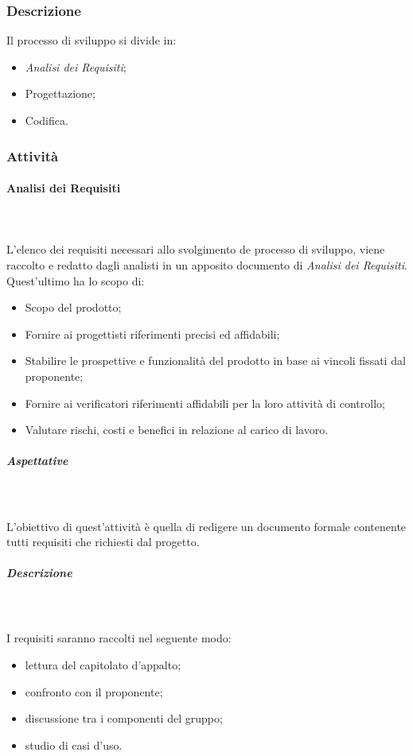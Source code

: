 		\subsubsection{Descrizione}
			Il processo di sviluppo si divide in:
				\begin{itemize}
					\item \textit{Analisi dei Requisiti};
					\item Progettazione;
					\item Codifica.
				\end{itemize}
		\subsubsection{Attività}
			\paragraph{Analisi dei Requisiti} \mbox{} \\ \mbox{} \\
			L'elenco dei requisiti necessari allo svolgimento de processo di sviluppo, viene raccolto e redatto dagli analisti in un apposito documento di \textit{Analisi dei Requisiti}. Quest'ultimo ha lo scopo di:
				\begin{itemize}
					\item Scopo del prodotto;
					\item Fornire ai progettisti riferimenti precisi ed affidabili;
					\item Stabilire le prospettive e funzionalità del prodotto in base ai vincoli fissati dal proponente;
					\item Fornire ai verificatori riferimenti affidabili per la loro attività di controllo;
					\item Valutare rischi, costi e benefici in relazione al carico di lavoro.
				\end{itemize} 
			\subparagraph*{Aspettative} \mbox{} \\ \mbox{} \\
			L'obiettivo di quest'attività è quella di redigere un documento formale contenente tutti requisiti che richiesti dal progetto.
			\subparagraph*{Descrizione} \mbox{} \\ \mbox{} \\
			I requisiti saranno raccolti nel seguente modo:
				\begin{itemize} \newline
					\item lettura del capitolato d'appalto;
					\item confronto con il proponente;
					\item discussione tra i componenti del gruppo;
					\item studio di casi d'uso.
				\end{itemize}

